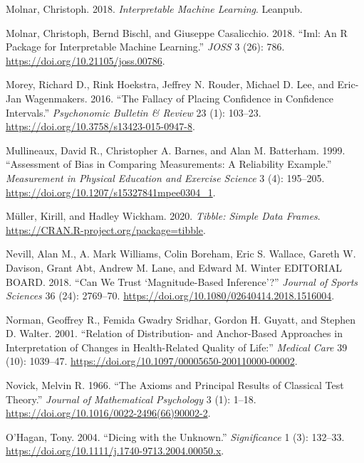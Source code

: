 \documentclass[
]{book}
\newlength{\cslhangindent}
\newenvironment{cslreferences}%
  {\setlength{\parindent}{0pt}%
  \everypar{\setlength{\hangindent}{\cslhangindent}}\ignorespaces}%
  {\par}
\begin{document}
\begin{cslreferences}
\leavevmode\hypertarget{ref-molnarInterpretableMachineLearning2018}{}%
Molnar, Christoph. 2018. \emph{Interpretable Machine Learning}. Leanpub.

\leavevmode\hypertarget{ref-molnarImlPackageInterpretable2018}{}%
Molnar, Christoph, Bernd Bischl, and Giuseppe Casalicchio. 2018. ``Iml: An R Package for Interpretable Machine Learning.'' \emph{JOSS} 3 (26): 786. \url{https://doi.org/10.21105/joss.00786}.

\leavevmode\hypertarget{ref-moreyFallacyPlacingConfidence2016}{}%
Morey, Richard D., Rink Hoekstra, Jeffrey N. Rouder, Michael D. Lee, and Eric-Jan Wagenmakers. 2016. ``The Fallacy of Placing Confidence in Confidence Intervals.'' \emph{Psychonomic Bulletin \& Review} 23 (1): 103--23. \url{https://doi.org/10.3758/s13423-015-0947-8}.

\leavevmode\hypertarget{ref-mullineauxAssessmentBiasComparing1999}{}%
Mullineaux, David R., Christopher A. Barnes, and Alan M. Batterham. 1999. ``Assessment of Bias in Comparing Measurements: A Reliability Example.'' \emph{Measurement in Physical Education and Exercise Science} 3 (4): 195--205. \url{https://doi.org/10.1207/s15327841mpee0304_1}.

\leavevmode\hypertarget{ref-R-tibble}{}%
Müller, Kirill, and Hadley Wickham. 2020. \emph{Tibble: Simple Data Frames}. \url{https://CRAN.R-project.org/package=tibble}.

\leavevmode\hypertarget{ref-nevillCanWeTrust2018}{}%
Nevill, Alan M., A. Mark Williams, Colin Boreham, Eric S. Wallace, Gareth W. Davison, Grant Abt, Andrew M. Lane, and Edward M. Winter EDITORIAL BOARD. 2018. ``Can We Trust `Magnitude-Based Inference'?'' \emph{Journal of Sports Sciences} 36 (24): 2769--70. \url{https://doi.org/10.1080/02640414.2018.1516004}.

\leavevmode\hypertarget{ref-normanRelationDistributionAnchorBased2001}{}%
Norman, Geoffrey R., Femida Gwadry Sridhar, Gordon H. Guyatt, and Stephen D. Walter. 2001. ``Relation of Distribution- and Anchor-Based Approaches in Interpretation of Changes in Health-Related Quality of Life:'' \emph{Medical Care} 39 (10): 1039--47. \url{https://doi.org/10.1097/00005650-200110000-00002}.

\leavevmode\hypertarget{ref-novickAxiomsPrincipalResults1966}{}%
Novick, Melvin R. 1966. ``The Axioms and Principal Results of Classical Test Theory.'' \emph{Journal of Mathematical Psychology} 3 (1): 1--18. \url{https://doi.org/10.1016/0022-2496(66)90002-2}.

\leavevmode\hypertarget{ref-ohaganDicingUnknown2004}{}%
O'Hagan, Tony. 2004. ``Dicing with the Unknown.'' \emph{Significance} 1 (3): 132--33. \url{https://doi.org/10.1111/j.1740-9713.2004.00050.x}.


\end{cslreferences}
\end{document}
